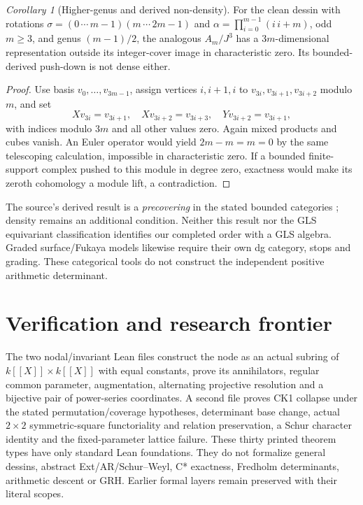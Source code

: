 \documentclass[11pt]{article}
\theoremstyle{definition}\newtheorem{definition}[theorem]{Definition}
\theoremstyle{remark}\newtheorem{remark}[theorem]{Remark}
\newtheorem{corollary}[theorem]{Corollary}
\begin{document}
\begin{corollary}[Higher-genus and derived non-density]\label{cover:higher}
For the clean dessin with rotations
$\sigma=(0\,\cdots\,m-1)(m\,\cdots\,2m-1)$ and
$\alpha=\prod_{i=0}^{m-1}(i\,i+m)$, odd $m\geq3$, and genus $(m-1)/2$,
the analogous $A_m/J^3$ has a $3m$-dimensional representation
outside its integer-cover image in characteristic zero. Its bounded-derived
push-down is not dense either.
\end{corollary}
\begin{proof}
Use basis $v_0,\ldots,v_{3m-1}$, assign vertices $i,i+1,i$ to
$v_{3i},v_{3i+1},v_{3i+2}$ modulo $m$, and set
\[
 Xv_{3i}=v_{3i+1},\quad Xv_{3i+2}=v_{3i+3},\quad
 Yv_{3i+2}=v_{3i+1},
\]
with indices modulo $3m$ and all other values zero. Again mixed products
and cubes vanish. An Euler operator would yield $2m-m=m=0$ by the same
telescoping calculation, impossible in characteristic zero. If a bounded
finite-support complex pushed to this module in degree zero, exactness would
make its zeroth cohomology a module lift, a contradiction.
\end{proof}

The source's derived result is a \emph{precovering} in the stated bounded
categories \cite[Theorem~4.28]{CoveringLecture2026}; density remains an
additional condition. Neither this result nor the GLS equivariant
classification \cite{TameGLS2026} identifies our completed order with a GLS
algebra. Graded surface/Fukaya models \cite{SchrollGeometric2026} likewise
require their own dg category, stops and grading. These categorical tools
do not construct the independent positive arithmetic determinant.


\section{Verification and research frontier}
The two nodal/invariant Lean files construct the node as an actual subring of $k[[X]]\times k[[X]]$ with equal constants, prove its annihilators, regular common parameter, augmentation, alternating projective resolution and a bijective pair of power-series coordinates. A second file proves CK1 collapse under the stated permutation/coverage hypotheses, determinant base change, actual $2\times2$ symmetric-square functoriality and relation preservation, a Schur character identity and the fixed-parameter lattice failure. These thirty printed theorem types have only standard Lean foundations. They do not formalize general dessins, abstract Ext/AR/Schur--Weyl, C* exactness, Fredholm determinants, arithmetic descent or GRH. Earlier formal layers remain preserved with their literal scopes.
\end{document}
